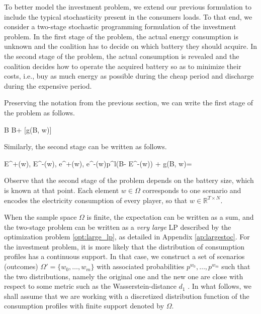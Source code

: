\documentclass[sigconf, table]{acmart}
\newcommand{\Ep}{E^+}
\newcommand{\Ene}{E^-}
\newcommand{\ep}{e^+}
\newcommand{\ene}{e^-}
\newcommand{\pricelow}{p^l}
\newcommand{\pricehigh}{p^h}
\newcommand{\bat}{B}
\newcommand{\ramp}{\delta}
\newcommand{\cons}{x}
\begin{document}
To better model the investment problem, we extend our previous formulation to include the typical stochasticity present in the consumers loads. To that end, we consider a two-stage stochastic programming formulation of the investment problem. 
In the first stage of the problem, the actual energy consumption is unknown and the coalition has to decide on which battery they should acquire. 
In the second stage of the problem, the actual consumption is revealed and the coalition decides how to operate the acquired battery so as to minimize their costs, i.e., buy as much energy as possible during the cheap period and discharge during the expensive period.

Preserving the notation from the previous section, we can write the first stage of the problem as follows.

\begin{mini!}[4]
{\bat}{  \bat + [g(\bat, w)]}{}{}
\label{eq:stoc_first_stage}
\addConstraint{\bat}{\geq 0}{}
\end{mini!}

Similarly, the second stage can be written as follows.

\begin{mini!}[3]
{\Ep(w), \Ene(w), \ep(w), \ene(w)}{\pricelow(\bat - \Ene(w)) + }{}{g(B, w)=}\label{opt:second_stage}
\breakObjective{ \pricehigh(\Ep(w) + \sum_t \ep_t(w)) }
\addConstraint{\ramp\bat + \ep_t(w) - \ene_t(w)}{ = \sum_{n \in S} \cons^n_t(w)}{ \ \forall t \in \mathcal{T},}
\addConstraint{\bat + \Ep(w) - \Ene(w)}{= \sum_t (\ramp\bat - \ene_t(w))}{}
\addConstraint{\Ep, \Ene, \ep, \ene}{\geq 0}{}
\end{mini!}

Observe that the second stage of the problem depends on the battery size, which is known at that point.
Each element $w \in \Omega$ corresponds to one scenario and encodes the electricity consumption of every player, so that $w \in \mathbb{R}^{T \times N}$.


When the sample space $\Omega$ is finite, the expectation can be written as a sum, and the two-stage problem can be written as a \textit{very large} LP described by the optimization problem \eqref{opt:large_lp}, as detailed in Appendix \ref{ap:largestoc}.
For the investment problem, it is more likely that the distribution of consumption profiles has a continuous support. In that case, we construct a set of scenarios (outcomes) $\Omega' = \{w_0, \dots, w_m\}$ with associated probabilities $p^{w_0}, \dots, p^{w_m}$ such that the two distributions, namely the original one and the new one are close with respect to some metric such as the Wasserstein-distance $d_1$ \cite{pflug2001scenario}.
In what follows, we shall assume that we are working with a discretized distribution function of the consumption profiles with finite support denoted by $\Omega$.
\end{document}
